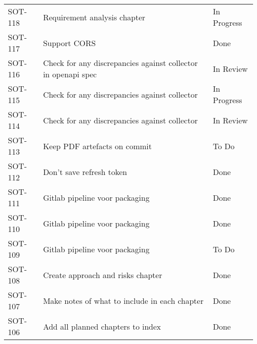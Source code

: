 \documentclass[dutch]{article}
\begin{document}
\begin{longtable}{@{}lp{6cm}l@{}}
    SOT-118            & Requirement analysis chapter                                                                                              & In Progress     \\
    SOT-117            & Support CORS                                                                                                              & Done            \\
    SOT-116            & Check for any discrepancies against collector in openapi spec                                                             & In Review       \\
    SOT-115            & Check for any discrepancies against collector                                                                             & In Progress     \\
    SOT-114            & Check for any discrepancies against collector                                                                             & In Review       \\
    SOT-113            & Keep PDF artefacts on commit                                                                                              & To Do           \\
    SOT-112            & Don't save refresh token                                                                                                  & Done            \\
    SOT-111            & Gitlab pipeline voor packaging                                                                                            & Done            \\
    SOT-110            & Gitlab pipeline voor packaging                                                                                            & Done            \\
    SOT-109            & Gitlab pipeline voor packaging                                                                                            & To Do           \\
    SOT-108            & Create approach and risks chapter                                                                                         & Done            \\
    SOT-107            & Make notes of what to include in each chapter                                                                             & Done            \\
    SOT-106            & Add all planned chapters to index                                                                                         & Done            \\

\end{longtable}
\end{document}
